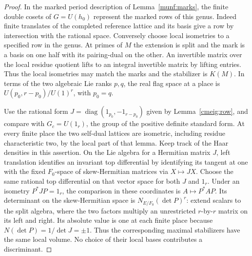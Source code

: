 \begin{proof}
In the marked period description of Lemma~\ref{munf:marks}, the
finite double cosets of \(G=U(h_0)\) represent the marked rows of
this genus. Indeed finite translates of the completed reference
lattice and its basis give a row by intersection with the rational
space. Conversely choose local isometries to a specified row in
the genus. At primes of \(M\) the extension is split and the mark
is a basis on one half with its pairing-dual on the other. An
invertible matrix over the local residue quotient lifts to an
integral invertible matrix by lifting entries. Thus the local
isometries may match the marks and the stabilizer is \(K(M)\).
In terms of the two algebraic Lie ranks \(p,q\), the real flag
space at a place is \(U(p_0,r-p_0)/U(1)^r\), with \(p_0=q\).

Use the rational form \(J=\operatorname{diag}(1_{p_0},-1_{r-p_0})\) given
by Lemma~\ref{cmeig:row}, and compare with \(G_c=U(1_r)\), the
group of the positive definite standard form. At every finite
place the two self-dual lattices are isometric, including residue
characteristic two, by the local part of that lemma. Keep track of
the Haar densities in this assertion. On the Lie algebra for a
Hermitian matrix \(J\), left translation identifies an invariant
top differential by identifying its tangent at one with the fixed
\(F_0\)-space of skew-Hermitian matrices via \(X\mapsto JX\).
Choose the same rational top differential on that vector space
for both \(J\) and \(1_r\). Under an isometry \(P^*JP=1_r\),
the comparison in these coordinates is \(A\mapsto P^*AP\).
Its determinant on the skew-Hermitian space is
\(N_{E/F_0}(\det P)^r\): extend scalars to the split algebra,
where the two factors multiply an unrestricted \(r\)-by-\(r\)
matrix on its left and right. Its absolute value is one at each
finite place because \(N(\det P)=1/\det J=\pm1\).
Thus the corresponding maximal stabilizers have the same local
volume. No choice of their local bases contributes a discriminant.


\end{proof}
